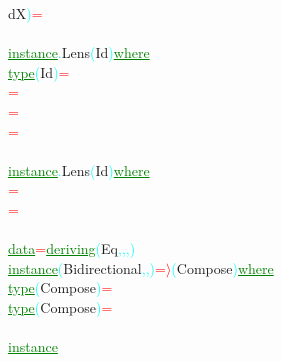 {\rm{}dX}\textcolor{cyan}{)}\hsspace \textcolor{red}{=}\\\\\textcolor{green}{\underline{instance}}\textcolor{cyan}{.}{\rm{}Lens}\hsspace \textcolor{cyan}{(}{\rm{}Id}\textcolor{cyan}{)}\hsspace \textcolor{green}{\underline{where}}\\\hstab \textcolor{green}{\underline{type}}\hsspace \textcolor{cyan}{(}{\rm{}Id}\textcolor{cyan}{)}\hsspace \textcolor{red}{=}\hsspace {\rm{}()}\\\hsspace \textcolor{red}{=}\hsspace {\rm{}()}\\\hsspace \hsspace \hsspace \textcolor{red}{=}\\\hsspace \hsspace \hsspace \textcolor{red}{=}\\\\\textcolor{green}{\underline{instance}}\textcolor{cyan}{.}{\rm{}Lens}\hsspace \textcolor{cyan}{(}{\rm{}Id}\textcolor{cyan}{)}\hsspace \textcolor{green}{\underline{where}}\\\hsspace \textcolor{red}{=}\\\hsspace \textcolor{red}{=}\\\\\textcolor{green}{\underline{data}}\hsspace \textcolor{red}{=}\hsspace \textcolor{green}{\underline{deriving}}\hsspace \textcolor{cyan}{(}{\rm{}Eq}\textcolor{cyan}{,}\textcolor{cyan}{,}\textcolor{cyan}{,}\textcolor{cyan}{)}\\\textcolor{green}{\underline{instance}}\hsspace \textcolor{cyan}{(}{\rm{}Bidirectional}\textcolor{cyan}{,}\textcolor{cyan}{,}\hsspace \textcolor{red}{\tilde{ }}\textcolor{cyan}{)}\hsspace \textcolor{red}{=\ensuremath{\rangle}}\hsspace \textcolor{cyan}{(}{\rm{}Compose}\textcolor{cyan}{)}\hsspace \textcolor{green}{\underline{where}}\\\hstab \textcolor{green}{\underline{type}}\hsspace \textcolor{cyan}{(}{\rm{}Compose}\textcolor{cyan}{)}\hsspace \textcolor{red}{=}\\\hstab \textcolor{green}{\underline{type}}\hsspace \textcolor{cyan}{(}{\rm{}Compose}\textcolor{cyan}{)}\hsspace \textcolor{red}{=}\\\\\textcolor{green}{\underline{instance}}\hsspace 